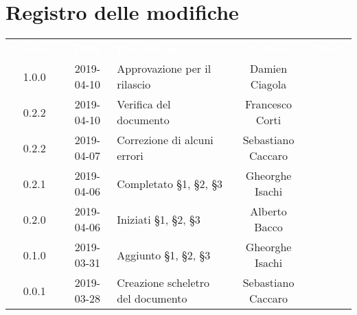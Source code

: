 \section*{Registro delle modifiche}
{
	\renewcommand{\arraystretch}{1.5}
	\centering
	\begin{longtable}{ c c C{6cm} c c }
		\textcolor{white}{\textbf{Versione}} & \textcolor{white}{\textbf{Data}} & \textcolor{white}{\textbf{Descrizione}} & \textcolor{white}{\textbf{Autore}} & \textcolor{white}{\textbf{Ruolo}}\\
		
		1.0.0 & 2019-04-10 & Approvazione per il rilascio & Damien Ciagola & \RdP{} \\ 
			
		0.2.2 & 2019-04-10 & Verifica del documento & Francesco Corti & \ver{} \\ 
		
		0.2.2 & 2019-04-07 & Correzione di alcuni errori & Sebastiano Caccaro & \reda{} \\ 

		0.2.1 & 2019-04-06 & Completato \S1, \S2, \S3 & Gheorghe Isachi & \reda{} \\
		
		0.2.0 & 2019-04-06 & Iniziati \S1, \S2, \S3 & Alberto Bacco & \reda{} \\
		
		0.1.0 & 2019-03-31 & Aggiunto \S1, \S2, \S3 & Gheorghe Isachi & \reda{} \\
		
		0.0.1 & 2019-03-28 & Creazione scheletro del documento & Sebastiano Caccaro & \reda{}
		
	\end{longtable}

}